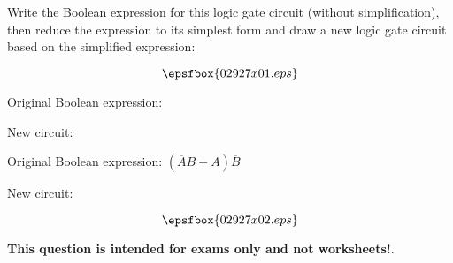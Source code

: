 

Write the Boolean expression for this logic gate circuit (without simplification), then reduce the expression to its simplest form and draw a new logic gate circuit based on the simplified expression:

$$\epsfbox{02927x01.eps}$$

Original Boolean expression:

\vskip 10pt

New circuit:

\vskip 30pt







Original Boolean expression: $(\overline{A}B + A)\overline{B}$

\vskip 10pt

New circuit:

$$\epsfbox{02927x02.eps}$$







{\bf This question is intended for exams only and not worksheets!}.




